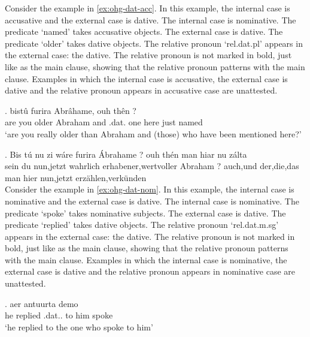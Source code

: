 Consider the example in \ref{ex:ohg-dat-acc}. In this example, the internal case is accusative and the external case is dative.
The internal case is nominative. The predicate  `named' takes accusative objects.
The external case is dative. The predicate  `older' takes dative objects.
The relative pronoun  `\ac{rel}.\ac{dat}.\ac{pl}' appears in the external case: the dative. The relative pronoun is not marked in bold, just like as the main clause, showing that the relative pronoun patterns with the main clause.
Examples in which the internal case is accusative, the external case is dative and the relative pronoun appears in accusative case are unattested.

\exg. bistû furira Abrâhame, ouh thên    ?\\
 {are you} older\scsub{[dat]} {Abraham} and .\ac{dat}. one here just named\scsub{[acc]}\\
 `are you really older than Abraham and (those) who have been mentioned here?' \label{ex:ohg-dat-acc}

\exg. Bis	tú	nu	{zi wáre}	furira	Ábrahame	?	ouh	thén	man	hiar	nu	zálta\\
sein	du	nun,jetzt	wahrlich	erhabener,wertvoller	Abraham	?	auch,und	der,die,das	man	hier	nun,jetzt	erzählen,verkünden\\



Consider the example in \ref{ex:ohg-dat-nom}. In this example, the internal case is nominative and the external case is dative.
The internal case is nominative. The predicate  `spoke' takes nominative subjects.
The external case is dative. The predicate  `replied' takes dative objects.
The relative pronoun  `\ac{rel}.\ac{dat}.\ac{m}.\ac{sg}' appears in the external case: the dative. The relative pronoun is not marked in bold, just like as the main clause, showing that the relative pronoun patterns with the main clause.
Examples in which the internal case is nominative, the external case is dative and the relative pronoun appears in nominative case are unattested.

\exg. aer antuurta demo  \\
 he replied\scsub{[dat]} .\ac{dat}.. {to him} spoke\scsub{[nom]}\\
 `he replied to the one who spoke to him' \label{ex:ohg-dat-nom}


